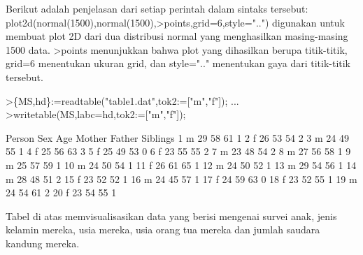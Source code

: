 \documentclass[a4paper,10pt]{article}
\begin{document}
\begin{eulernotebook}
\begin{eulercomment}
\begin{eulercomment}
\begin{eulercomment}
\begin{eulercomment}
\begin{eulercomment}
\begin{eulercomment}
\begin{eulercomment}
\begin{eulercomment}
\begin{eulercomment}
\begin{eulercomment}
\begin{eulercomment}
\begin{eulercomment}
\begin{eulercomment}
\begin{eulercomment}
\begin{eulercomment}
\begin{eulercomment}
\begin{eulercomment}
Berikut adalah penjelasan dari setiap perintah dalam sintaks tersebut:\\
plot2d(normal(1500),normal(1500),\textgreater{}points,grid=6,style="..") digunakan
untuk membuat plot 2D dari dua distribusi normal yang menghasilkan
masing-masing 1500 data. \textgreater{}points menunjukkan bahwa plot yang
dihasilkan berupa titik-titik, grid=6 menentukan ukuran grid, dan
style=".." menentukan gaya dari titik-titik tersebut.
\end{eulercomment}
\begin{eulerprompt}
>\{MS,hd\}:=readtable("table1.dat",tok2:=["m","f"]); ...
>writetable(MS,labc=hd,tok2:=["m","f"]);
\end{eulerprompt}
\begin{euleroutput}
      Person       Sex       Age    Mother    Father  Siblings
           1         m        29        58        61         1
           2         f        26        53        54         2
           3         m        24        49        55         1
           4         f        25        56        63         3
           5         f        25        49        53         0
           6         f        23        55        55         2
           7         m        23        48        54         2
           8         m        27        56        58         1
           9         m        25        57        59         1
          10         m        24        50        54         1
          11         f        26        61        65         1
          12         m        24        50        52         1
          13         m        29        54        56         1
          14         m        28        48        51         2
          15         f        23        52        52         1
          16         m        24        45        57         1
          17         f        24        59        63         0
          18         f        23        52        55         1
          19         m        24        54        61         2
          20         f        23        54        55         1
\end{euleroutput}
\begin{eulercomment}
Tabel di atas memvisualisasikan data yang berisi mengenai survei anak,
jenis kelamin mereka, usia mereka, usia orang tua mereka dan jumlah
saudara kandung mereka.


\end{eulercomment}
\end{eulercomment}
\end{eulercomment}
\end{eulercomment}
\end{eulercomment}
\end{eulercomment}
\end{eulercomment}
\end{eulercomment}
\end{eulercomment}
\end{eulercomment}
\end{eulercomment}
\end{eulercomment}
\end{eulercomment}
\end{eulercomment}
\end{eulercomment}
\end{eulercomment}
\end{eulercomment}
\end{eulernotebook}
\end{document}
